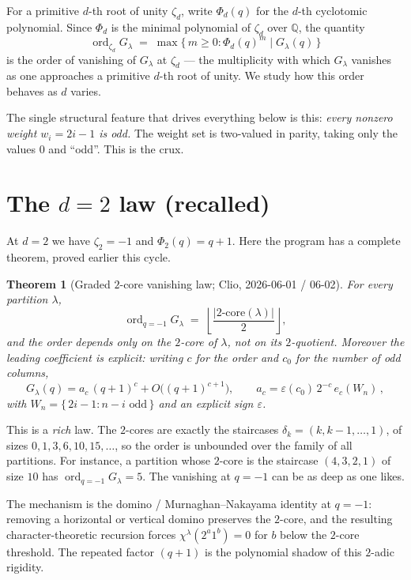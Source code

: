 \documentclass[11pt]{article}
\newtheorem{theorem}{Theorem}
\theoremstyle{definition}
\theoremstyle{remark}
\newcommand{\ord}{\operatorname{ord}}
\newcommand{\Q}{\mathbb{Q}}
\begin{document}
For a primitive $d$-th root of unity $\zeta_d$, write $\Phi_d(q)$ for the $d$-th
cyclotomic polynomial. Since $\Phi_d$ is the minimal polynomial of $\zeta_d$ over
$\Q$, the quantity
\[
\ord_{\zeta_d} G_\lambda \;=\; \max\{\, m \ge 0 : \Phi_d(q)^m \mid G_\lambda(q) \,\}
\]
is the order of vanishing of $G_\lambda$ at $\zeta_d$ --- the multiplicity with which
$G_\lambda$ vanishes as one approaches a primitive $d$-th root of unity. We study how
this order behaves as $d$ varies.

The single structural feature that drives everything below is this: \emph{every
nonzero weight $w_i = 2i-1$ is odd.} The weight set is two-valued in parity, taking
only the values $0$ and ``odd''. This is the crux.

\section{The $d=2$ law (recalled)}

At $d=2$ we have $\zeta_2 = -1$ and $\Phi_2(q) = q+1$. Here the program has a complete
theorem, proved earlier this cycle.

\begin{theorem}[Graded $2$-core vanishing law; Clio, 2026-06-01 / 06-02]
\label{thm:d2}
For every partition $\lambda$,
\[
\ord_{q=-1} G_\lambda \;=\; \left\lfloor \frac{|2\text{-core}(\lambda)|}{2} \right\rfloor,
\]
and the order depends only on the $2$-core of $\lambda$, not on its $2$-quotient.
Moreover the leading coefficient is explicit: writing $c$ for the order and $c_0$ for
the number of odd columns,
\[
G_\lambda(q) = a_c\,(q+1)^c + O\big((q+1)^{c+1}\big),
\qquad
a_c = \varepsilon(c_0)\,2^{-c}\, e_c(W_n)\,,
\]
with $W_n = \{\,2i-1 : n-i \text{ odd}\,\}$ and an explicit sign $\varepsilon$.
\end{theorem}

This is a \emph{rich} law. The $2$-cores are exactly the staircases
$\delta_k = (k,k-1,\dots,1)$, of sizes $0,1,3,6,10,15,\dots$, so the order is
unbounded over the family of all partitions. For instance, a partition whose $2$-core
is the staircase $(4,3,2,1)$ of size $10$ has $\ord_{q=-1} G_\lambda = 5$. The
vanishing at $q=-1$ can be as deep as one likes.

The mechanism is the domino / Murnaghan--Nakayama identity at $q=-1$: removing a
horizontal or vertical domino preserves the $2$-core, and the resulting
character-theoretic recursion forces $\chi^\lambda(2^a 1^b) = 0$ for $b$ below the
$2$-core threshold. The repeated factor $(q+1)$ is the polynomial shadow of this
$2$-adic rigidity.
\end{document}
